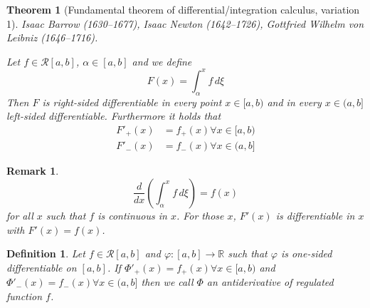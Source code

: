 \documentclass{article}
\newtheorem{theorem}{Theorem}  \numberwithin{theorem}{section}
\newtheorem{definition}{Definition}  \numberwithin{definition}{section}
\newtheorem{remark}{Remark}  \numberwithin{remark}{section}
\begin{document}
\begin{theorem}[Fundamental theorem of differential/integration calculus, variation 1] %
  \label{ftofic}
  Isaac Barrow (1630--1677), Isaac Newton (1642--1726), Gottfried Wilhelm von Leibniz (1646--1716).

  Let $f \in \mathcal R[a,b]$, $\alpha \in [a,b]$ and we define
  \[ F(x) = \int_{\alpha}^x f \, d\xi \]
  Then $F$ is right-sided differentiable in every point $x \in [a,b)$ and in every $x \in (a,b]$ left-sided differentiable.
  Furthermore it holds that
  \begin{align}
    \label{ftdi}
    F'_+(x) &= f_+(x) \forall x \in [a,b) \\
    F'_-(x) &= f_-(x) \forall x \in (a,b]
  \end{align}
\end{theorem}

\begin{remark}
  \[ \frac{d}{dx} \left(\int_\alpha^x f \, d\xi\right) = f(x) \]
  for all $x$ such that $f$ is continuous in $x$.
  For those $x$, $F'(x)$ is differentiable in $x$ with $F'(x) = f(x)$.
\end{remark}

\begin{definition} %
  \label{def10}
  Let $f \in \mathcal R[a,b]$ and $\varphi: [a,b] \to \mathbb R$ such that $\varphi$ is one-sided differentiable on $[a,b]$.
  If $\Phi'_+(x) = f_+(x) \forall x \in [a,b)$ and $\Phi'_-(x) = f_-(x) \forall x \in (a,b]$
  then we call $\Phi$ an antiderivative of regulated function $f$.
\end{definition}
\end{document}
